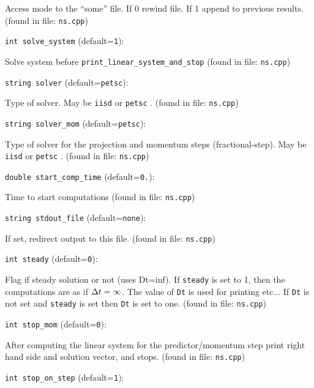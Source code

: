 Access mode to the ``some'' file. If 0 rewind file. If 1 
 append to previous  results.
 (found in file: \verb+ns.cpp+)
\item\verb+int solve_system+ {\rm(default=\verb|1|)}:

Solve system before  \verb+print_linear_system_and_stop+ 
 (found in file: \verb+ns.cpp+)
\item\verb+string solver+ {\rm(default=\verb|petsc|)}:

Type of solver. May be  \verb+iisd+  or  \verb+petsc+ . 
 (found in file: \verb+ns.cpp+)
\item\verb+string solver_mom+ {\rm(default=\verb|petsc|)}:

Type of solver for the projection and momentum steps
(fractional-step). May be  \verb+iisd+  or  \verb+petsc+ .
 (found in file: \verb+ns.cpp+)
\item\verb+double start_comp_time+ {\rm(default=\verb|0.|)}:

Time to start computations
 (found in file: \verb+ns.cpp+)
\item\verb+string stdout_file+ {\rm(default=\verb|none|)}:

If set, redirect output to this file.
 (found in file: \verb+ns.cpp+)
\item\verb+int steady+ {\rm(default=\verb|0|)}:

Flag if steady solution or not (uses Dt=inf). If  \verb+steady+ 
is set to 1, then the computations are as if ${\Delta t}=\infty$. 
The value of  \verb+Dt+  is used for printing etc... If  \verb+Dt+ 
is not set and  \verb+steady+  is set then  \verb+Dt+  is set to one.
 (found in file: \verb+ns.cpp+)
\item\verb+int stop_mom+ {\rm(default=\verb|0|)}:

After computing the linear system for the
 predictor/momentum step print right hand side
 and solution vector, and stops.
 (found in file: \verb+ns.cpp+)
\item\verb+int stop_on_step+ {\rm(default=\verb|1|)}:

